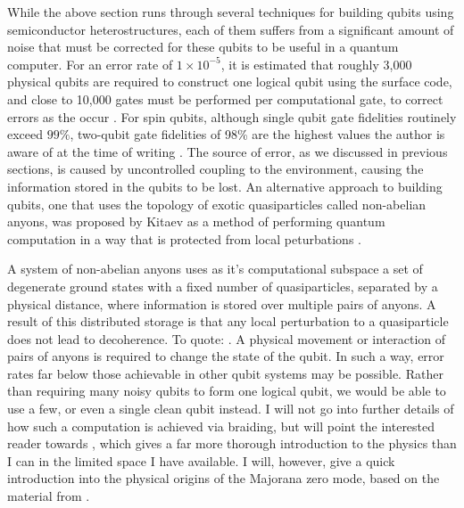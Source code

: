 While the above section runs through several techniques for building qubits using semiconductor heterostructures,
each of them suffers from a significant amount of noise that must be corrected for these qubits to be useful
in a quantum computer. For an error rate of $1 \times 10^{-5}$, it is estimated that roughly 3,000 physical qubits
are required to construct one logical qubit using the surface code, and close to 10,000 gates must be performed per computational gate, to correct
errors as the occur \cite{6657074}. For spin qubits, although single qubit gate fidelities routinely exceed $99\%$\cite{Zajac439}, two-qubit
gate fidelities of 98\% are the highest values the author is aware of at the time of writing \cite{PhysRevA.99.042310}.
The source of error, as we discussed in previous sections, is caused by uncontrolled coupling to the environment, causing the information stored in the qubits
to be lost. An alternative approach to building qubits, one that uses the topology of exotic quasiparticles called non-abelian anyons,
was proposed by Kitaev as a method of performing quantum computation in a way that is protected from local peturbations \cite{KITAEV20032}.

A system of non-abelian anyons uses as it's computational subspace a set of degenerate ground states with a fixed number
of quasiparticles, separated by a physical distance, where information is stored over multiple pairs of anyons. A result of this
distributed storage is that any local perturbation to a quasiparticle does not
lead to decoherence. To quote: . A physical movement or
interaction of pairs of anyons is required to change the state of the qubit. In such a way, error rates
far below those achievable in other qubit systems may be possible. Rather than requiring many noisy qubits to form one logical qubit,
we would be able to use a few, or even a single clean qubit instead. I will not go into further details of how such a computation
is achieved via braiding, but will point the interested reader towards \cite{RevModPhys.80.1083}, which
gives a far more thorough introduction to the physics than I can in the limited space I have available. I will, however, give a quick introduction
into the physical origins of the Majorana zero mode, based on the material from \cite{rafael_notes}.

